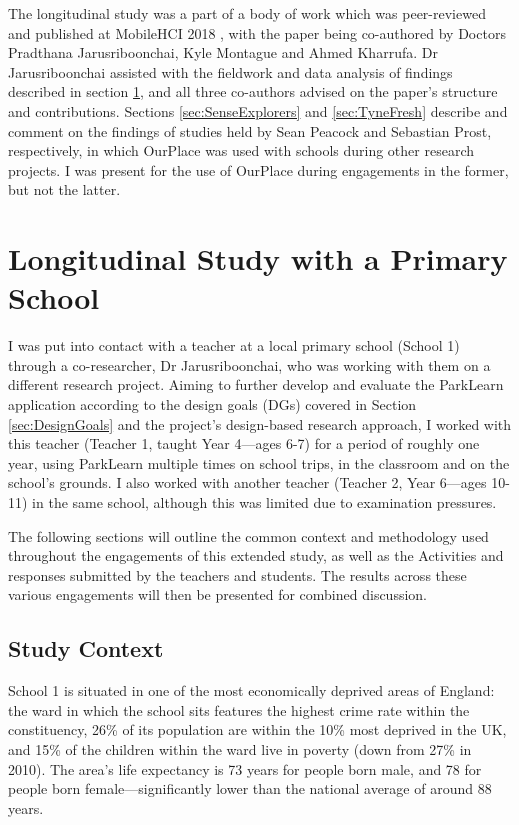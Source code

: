 The longitudinal study was a part of a body of work which was peer-reviewed and published at MobileHCI 2018 \citep{Richardson2018}, with the paper being co-authored by Doctors Pradthana Jarusriboonchai, Kyle Montague and Ahmed Kharrufa. Dr Jarusriboonchai assisted with the fieldwork and data analysis of findings described in section \ref{sec:LongitudinalSchool}, and all three co-authors advised on the paper's structure and contributions. Sections \ref{sec:SenseExplorers} and \ref{sec:TyneFresh} describe and comment on the findings of studies held by Sean Peacock and Sebastian Prost, respectively, in which OurPlace was used with schools during other research projects. I was present for the use of OurPlace during engagements in the former, but not the latter.

\section{Longitudinal Study with a Primary School}
\label{sec:LongitudinalSchool}

I was put into contact with a teacher at a local primary school (School 1) through a co-researcher, Dr Jarusriboonchai, who was working with them on a different research project. Aiming to further develop and evaluate the ParkLearn application according to the design goals (DGs) covered in Section \ref{sec:DesignGoals} and the project's design-based research approach, I worked with this teacher (Teacher 1, taught Year 4---ages 6-7) for a period of roughly one year, using ParkLearn multiple times on school trips, in the classroom and on the school's grounds. I also worked with another teacher (Teacher 2, Year 6---ages 10-11) in the same school, although this was limited due to examination pressures. 

The following sections will outline the common context and methodology used throughout the engagements of this extended study, as well as the Activities and responses submitted by the teachers and students. The results across these various engagements will then be presented for combined discussion.

\subsection{Study Context}
School 1 is situated in one of the most economically deprived areas of England: the ward in which the school sits features the highest crime rate within the constituency, 26\% of its population are within the 10\% most deprived in the UK, and 15\% of the children within the ward live in poverty (down from 27\% in 2010). The area's life expectancy is 73 years for people born male, and 78 for people born female---significantly lower than the national average of around 88 years.

